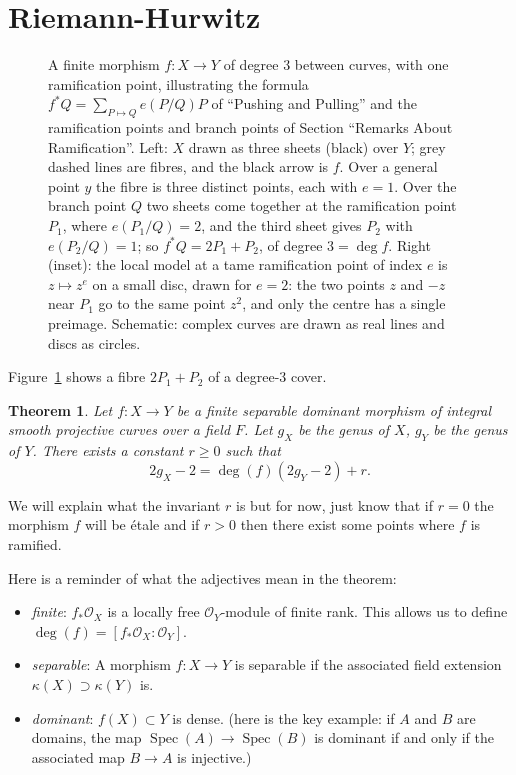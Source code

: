 \documentclass[12pt]{article}
\numberwithin{equation}{section}
\newtheorem{theorem}{Theorem}[subsection]
\theoremstyle{definition}
\theoremstyle{remark}
\newcommand{\Ocal}{\mathcal{O}}
\newcommand{\Spec}{\operatorname{Spec}}
\begin{document}
\section{Riemann-Hurwitz}
\begin{figure}[H]
\centering

\caption{A finite morphism $f:X\to Y$ of degree $3$ between curves, with one ramification point, illustrating the formula $f^{*}Q=\sum_{P\mapsto Q}e(P/Q)P$ of ``Pushing and Pulling'' and the ramification points and branch points of Section ``Remarks About Ramification''. Left: $X$ drawn as three sheets (black) over $Y$; grey dashed lines are fibres, and the black arrow is $f$. Over a general point $y$ the fibre is three distinct points, each with $e=1$. Over the branch point $Q$ two sheets come together at the ramification point $P_1$, where $e(P_1/Q)=2$, and the third sheet gives $P_2$ with $e(P_2/Q)=1$; so $f^{*}Q=2P_1+P_2$, of degree $3=\deg f$. Right (inset): the local model at a tame ramification point of index $e$ is $z\mapsto z^{e}$ on a small disc, drawn for $e=2$: the two points $z$ and $-z$ near $P_1$ go to the same point $z^2$, and only the centre has a single preimage. Schematic: complex curves are drawn as real lines and discs as circles.}\label{fig:ramified-cover}
\end{figure}
Figure~\ref{fig:ramified-cover} shows a fibre $2P_1+P_2$ of a degree-$3$ cover.


\begin{theorem}
	Let $f:X \to Y$ be a finite separable dominant morphism of integral smooth projective curves over a field $F$. 
	Let $g_X$ be the genus of $X$, $g_Y$ be the genus of $Y$.
	There exists a constant $r\geq 0$ such that 
	 $$ 2g_X-2 = \deg(f)( 2g_Y - 2) + r. $$
\end{theorem}
We will explain what the invariant $r$ is but for now, just know that if $r=0$ the morphism $f$ will be \'etale and if $r>0$ then there exist some points where $f$ is ramified. 

Here is a reminder of what the adjectives mean in the theorem:
\begin{itemize}
	\item \emph{finite}: $f_*\Ocal_X$ is a locally free $\Ocal_Y$-module of finite rank. This allows us to define $\deg(f) = [f_*\Ocal_X:\Ocal_Y]$.
	\item \emph{separable}: A morphism $f:X \to Y$ is separable if the associated field extension $\kappa(X)\supset \kappa(Y)$ is. 
	\item \emph{dominant}: $f(X)\subset Y$ is dense. 
	(here is the key example: if $A$ and $B$ are domains, the map $\Spec(A) \to \Spec(B)$ is dominant if and only if the associated map $B\to A$ is injective.)
\end{itemize}
\end{document}
